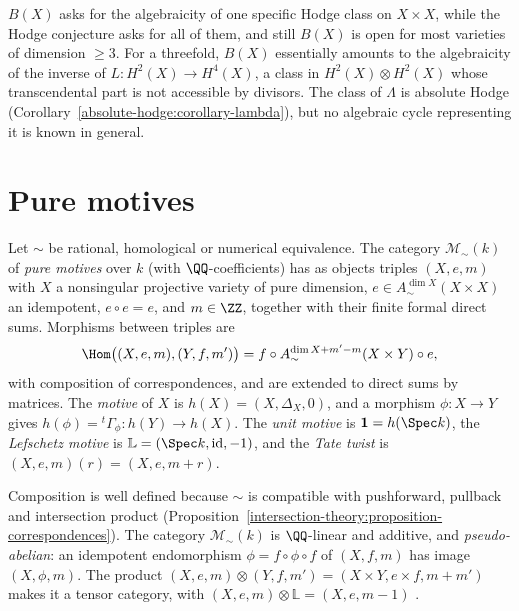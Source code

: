 \begin{remark}\label{absolute-hodge:remark-weakness}
$B(X)$ asks for the algebraicity of one specific Hodge class on $X \times X$, while the Hodge conjecture asks for all of them, and still $B(X)$ is open for most varieties of dimension $\geq 3$. For a
threefold, $B(X)$ essentially amounts to the algebraicity of the inverse of $L \colon H^2(X) \to H^4(X)$, a class in $H^2(X) \otimes H^2(X)$ whose transcendental part is not accessible by divisors. The class of $\Lambda$ is absolute
Hodge (Corollary~\ref{absolute-hodge:corollary-lambda}), but no algebraic cycle representing it is known in general.
\end{remark}

\section{Pure motives}\label{absolute-hodge:section-motives}

\begin{definition}\label{absolute-hodge:definition-motives}
Let $\sim$ be rational, homological or numerical equivalence. The category $\mathcal{M}_\sim(k)$ of \emph{pure motives} over $k$ (with $\QQ$-coefficients) has as objects triples $(X, e, m)$ with $X$ a
nonsingular projective variety of pure dimension, $e \in A^{\dim X}_\sim(X \times X)$ an idempotent, $e \circ e = e$, and $m \in \ZZ$, together with their finite formal direct sums. Morphisms between triples are
\[
\Hom\big((X, e, m), (Y, f, m')\big) = f \circ A^{\dim X + m' - m}_\sim(X \times Y) \circ e,
\]
with composition of correspondences, and are extended to direct sums by matrices. The \emph{motive} of $X$ is $h(X) = (X, \Delta_X, 0)$, and a morphism $\phi \colon X \to Y$ gives
$h(\phi) = {}^t\Gamma_\phi \colon h(Y) \to h(X)$. The \emph{unit motive} is $\mathbf{1} = h(\Spec k)$, the \emph{Lefschetz motive} is $\mathbb{L} = (\Spec k, \mathrm{id}, -1)$, and the \emph{Tate twist} is
$(X, e, m)(r) = (X, e, m + r)$.
\end{definition}

Composition is well defined because $\sim$ is compatible with pushforward, pullback and intersection product (Proposition~\ref{intersection-theory:proposition-correspondences}). The category
$\mathcal{M}_\sim(k)$ is $\QQ$-linear and additive, and \emph{pseudo-abelian}: an idempotent endomorphism $\phi = f \circ \phi \circ f$ of $(X, f, m)$ has image $(X, \phi, m)$. The product
$(X, e, m) \otimes (Y, f, m') = (X \times Y, e \times f, m + m')$ makes it a tensor category, with $(X, e, m) \otimes \mathbb{L} = (X, e, m - 1)$ \cite{scholl-1994}.

